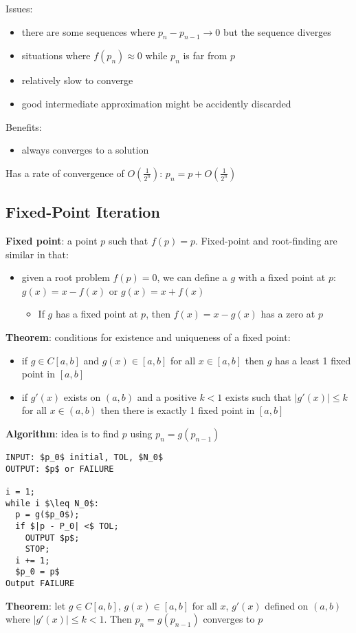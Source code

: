 \documentclass{article}
\begin{document}
Issues:
\begin{itemize}
  \item there are some sequences where $p_n - p_{n-1} \rightarrow 0$ but the sequence diverges
  \item situations where $f(p_n) \approx 0$ while $p_n$ is far from $p$
  \item relatively slow to converge
  \item good intermediate approximation might be accidently discarded
\end{itemize}
Benefits:
\begin{itemize}
  \item always converges to a solution
\end{itemize}
Has a rate of convergence of $O(\frac{1}{2^n})$: $p_n = p + O(\frac{1}{2^n})$
\subsection{Fixed-Point Iteration}
\textbf{Fixed point}: a point $p$ such that $f(p) = p$. Fixed-point and root-finding are similar in that:
\begin{itemize}
  \item given a root problem $f(p) = 0$, we can define a $g$ with a fixed point at $p$: $g(x) = x - f(x)$ or $g(x) = x + f(x)$
    \begin{itemize}
      \item If $g$ has a fixed point at $p$, then $f(x) = x - g(x)$ has a zero at $p$
    \end{itemize}
\end{itemize}
\textbf{Theorem}: conditions for existence and uniqueness of a fixed point:
\begin{itemize}
  \item if $g \in C[a,b]$ and $g(x) \in [a,b]$ for all $x \in [a,b]$ then $g$ has a least 1 fixed point in $[a,b]$
  \item if $g'(x)$ exists on $(a,b)$ and a positive $k < 1$ exists such that $|g'(x)| \leq k$ for all $x \in (a,b)$ then there is exactly 1 fixed point in $[a,b]$
\end{itemize}
\textbf{Algorithm}: idea is to find $p$ using $p_n = g(p_{n-1})$
\begin{lstlisting}
INPUT: $p_0$ initial, TOL, $N_0$ 
OUTPUT: $p$ or FAILURE

i = 1;
while i $\leq N_0$:
  p = g($p_0$);
  if $|p - P_0| <$ TOL;
    OUTPUT $p$;
    STOP;
  i += 1;
  $p_0 = p$
Output FAILURE
\end{lstlisting}
\textbf{Theorem}: let $g \in C[a,b]$, $g(x) \in [a,b]$ for all $x$, $g'(x)$ defined on $(a,b)$ where $|g'(x)| \leq k < 1$. Then $p_n = g(p_{n-1})$ converges to $p$
\end{document}
